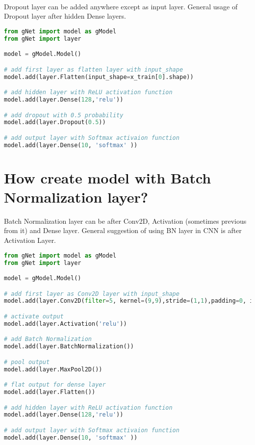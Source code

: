\documentclass[12pt]{report}
\begin{document}
\paragraph{}
Dropout layer can be added anywhere except as input layer. General usage of Dropout layer after hidden Dense layers. 

\begin{lstlisting}[language=Python, numbers=none, caption={Create model with Dropout.}, label={ex:create-dropout-model}]
from gNet import model as gModel
from gNet import layer

model = gModel.Model()

# add first layer as flatten layer with input_shape
model.add(layer.Flatten(input_shape=x_train[0].shape))

# add hidden layer with ReLU activation function
model.add(layer.Dense(128,'relu'))

# add dropout with 0.5 probability
model.add(layer.Dropout(0.5))

# add output layer with Softmax activaion function 
model.add(layer.Dense(10, 'softmax' ))

\end{lstlisting}



\section{How create model with Batch Normalization layer?}
\paragraph{}
Batch Normalization layer can be after Conv2D, Activation (sometimes previous from it) and Dense layer. General suggestion of using BN layer in CNN is after Activation Layer. 

\begin{lstlisting}[language=Python, numbers=none, caption={Create model with Batch Normalization.}, label={ex:create-bn-model}]
from gNet import model as gModel
from gNet import layer

model = gModel.Model()

# add first layer as Conv2D layer with input_shape
model.add(layer.Conv2D(filter=5, kernel=(9,9),stride=(1,1),padding=0, input_shape=x_train.shape[1:], use_bias=True))

# activate output
model.add(layer.Activation('relu'))

# add Batch Normalization
model.add(layer.BatchNormalization())

# pool output
model.add(layer.MaxPool2D())

# flat output for dense layer
model.add(layer.Flatten())

# add hidden layer with ReLU activation function
model.add(layer.Dense(128,'relu'))

# add output layer with Softmax activaion function 
model.add(layer.Dense(10, 'softmax' ))

\end{lstlisting}
\end{document}
